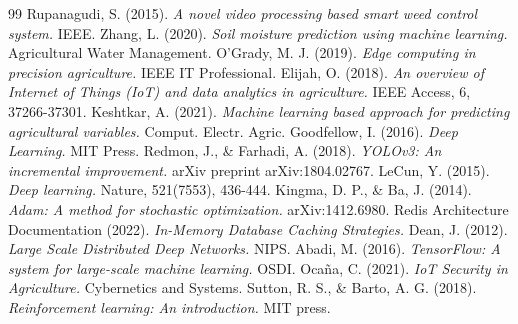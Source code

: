 \documentclass[12pt, a4paper]{report}
\begin{document}
\begin{thebibliography}{99}
 Rupanagudi, S. (2015). \textit{A novel video processing based smart weed control system.} IEEE.
 Zhang, L. (2020). \textit{Soil moisture prediction using machine learning.} Agricultural Water Management.
 O'Grady, M. J. (2019). \textit{Edge computing in precision agriculture.} IEEE IT Professional.
 Elijah, O. (2018). \textit{An overview of Internet of Things (IoT) and data analytics in agriculture.} IEEE Access, 6, 37266-37301.
 Keshtkar, A. (2021). \textit{Machine learning based approach for predicting agricultural variables.} Comput. Electr. Agric.
 Goodfellow, I. (2016). \textit{Deep Learning.} MIT Press.
 Redmon, J., \& Farhadi, A. (2018). \textit{YOLOv3: An incremental improvement.} arXiv preprint arXiv:1804.02767.
 LeCun, Y. (2015). \textit{Deep learning.} Nature, 521(7553), 436-444.
 Kingma, D. P., \& Ba, J. (2014). \textit{Adam: A method for stochastic optimization.} arXiv:1412.6980.
 Redis Architecture Documentation (2022). \textit{In-Memory Database Caching Strategies.}
 Dean, J. (2012). \textit{Large Scale Distributed Deep Networks.} NIPS.
 Abadi, M. (2016). \textit{TensorFlow: A system for large-scale machine learning.} OSDI.
 Ocaña, C. (2021). \textit{IoT Security in Agriculture.} Cybernetics and Systems.
 Sutton, R. S., \& Barto, A. G. (2018). \textit{Reinforcement learning: An introduction.} MIT press.
\end{thebibliography}
\end{document}
